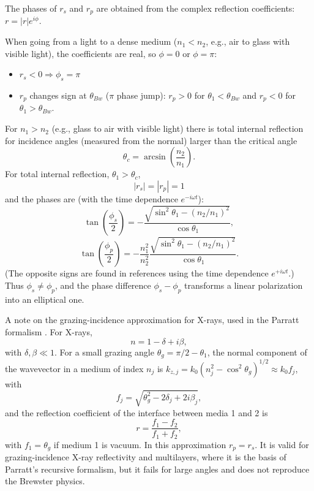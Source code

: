\documentclass{iucr}
\begin{document}
The phases of $r_s$ and $r_p$ are
obtained from the complex
reflection coefficients:
$r = |r| e^{i\phi}$.

When going from a light to a dense medium ($n_1<n_2$, e.g., air to glass with visible light), the coefficients are real, so $\phi = 0$ or $\phi = \pi$:
\begin{itemize}
\item $r_s < 0 \Rightarrow \phi_s = \pi$
\item $r_p$ changes sign at $\theta_{Bw}$ ($\pi$ phase jump): $r_p>0$ for $\theta_1<\theta_{Bw}$ and $r_p<0$ for $\theta_1>\theta_{Bw}$.
\end{itemize}

For $n_1 > n_2$ (e.g., glass to air with visible light) there is total internal reflection for incidence angles (measured from the normal) larger than the critical angle
\begin{equation}
\theta_c = \arcsin\left(\frac{n_2}{n_1}\right).
\end{equation}
For total internal reflection, $\theta_1 > \theta_c$,
\begin{equation}
|r_s| = |r_p| = 1
\end{equation}
and the phases are (with the time dependence $e^{-i\omega t}$):
\begin{equation}\label{eq:mirrorphases}
\tan\left(\frac{\phi_s}{2}\right)
=
-\frac{\sqrt{\sin^2\theta_1 - (n_2/n_1)^2}}
     {\cos\theta_1},
\end{equation}
\begin{equation}\label{eq:mirrorphasep}
\tan\left(\frac{\phi_p}{2}\right)
=
-\frac{n_1^2}{n_2^2}
\frac{\sqrt{\sin^2\theta_1 - (n_2/n_1)^2}}
     {\cos\theta_1}.
\end{equation}
(The opposite signs are found in references using the time dependence $e^{+i\omega t}$.)
Thus $\phi_s \neq \phi_p$, and the phase difference $\phi_s-\phi_p$ transforms a linear polarization into an elliptical one.

A note on the grazing-incidence approximation for X-rays, used in the Parratt formalism \cite{parratt}. For X-rays,
\begin{equation}
n = 1 - \delta + i\beta,
\end{equation}
with $\delta,\beta \ll 1$. For a small grazing angle $\theta_g=\pi/2-\theta_1$, the normal component of the wavevector in a medium of index $n_j$ is $k_{z,j}=k_0 (n_j^2-\cos^2\theta_g)^{1/2}\approx k_0 f_j$, with
\begin{equation}
f_j = \sqrt{\theta_g^2 - 2\delta_j + 2i\beta_j},
\end{equation}
and the reflection coefficient of the interface between media 1 and 2 is
\begin{equation}
r = \frac{f_1 - f_2}{f_1 + f_2},
\end{equation}
with $f_1=\theta_g$ if medium 1 is vacuum. In this approximation $r_p=r_s$. It is valid for grazing-incidence X-ray reflectivity and multilayers, where it is the basis of Parratt's recursive formalism, but it fails for large angles and does not reproduce the Brewster physics.
\end{document}
